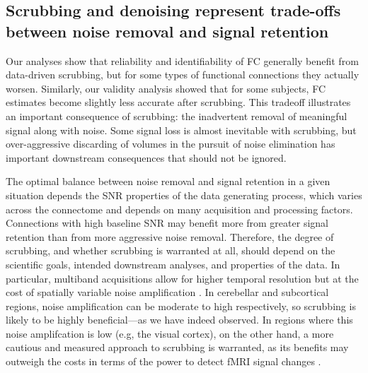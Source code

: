 \documentclass{article}
\begin{document}
\subsection{Scrubbing and denoising represent trade-offs between noise removal and signal retention}

Our analyses show that reliability and identifiability of FC generally benefit from data-driven scrubbing, but for some types of functional connections they actually worsen. Similarly, our validity analysis showed that for some subjects, FC estimates become slightly less accurate after scrubbing. This tradeoff illustrates an important consequence of scrubbing: the inadvertent removal of meaningful signal along with noise. Some signal loss is almost inevitable with scrubbing, but over-aggressive discarding of volumes in the pursuit of noise elimination has important downstream consequences that should not be ignored. 

The optimal balance between noise removal and signal retention in a given situation depends the SNR properties of the data generating process, which varies across the connectome and depends on many acquisition and processing factors. Connections with high baseline SNR may benefit more from greater signal retention than from more aggressive noise removal. Therefore, the degree of scrubbing, and whether scrubbing is warranted at all, should depend on the scientific goals, intended downstream analyses, and properties of the data. In particular, multiband acquisitions allow for higher temporal resolution but at the cost of spatially variable noise amplification \citep{risk2021multiband}. In cerebellar and subcortical regions, noise amplification can be moderate to high respectively, so scrubbing is likely to be highly beneficial---as we have indeed observed.  In regions where this noise amplifcation is low (e.g, the visual cortex), on the other hand, a more cautious and measured approach to scrubbing is warranted, as its benefits may outweigh the costs in terms of the power to detect fMRI signal changes \citep{chen2015evaluation, todd2017functional, risk2018impacts}. 
\end{document}

